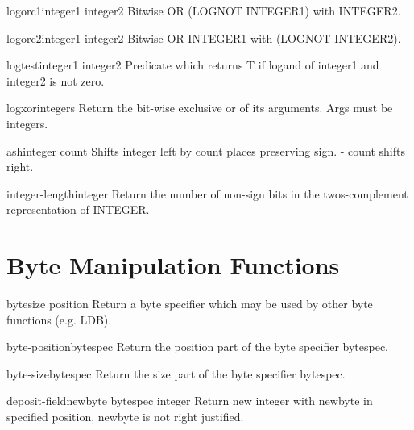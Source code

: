 \documentclass[10pt,english]{book}
\begin{document}
\begin{function}{logorc1}{integer1 integer2}
  Bitwise OR (LOGNOT INTEGER1) with INTEGER2.
\end{function}

\begin{function}{logorc2}{integer1 integer2}
  Bitwise OR INTEGER1 with (LOGNOT INTEGER2).
\end{function}

\begin{function}{logtest}{integer1 integer2}
  Predicate which returns T if logand of integer1 and integer2 is not zero.
\end{function}

\begin{function}{logxor}{\rest integers}
  Return the bit-wise exclusive or of its arguments. Args must be integers.
\end{function}

\begin{function}{ash}{integer count}
  Shifts integer left by count places preserving sign. - count shifts right.
\end{function}

\begin{function}{integer-length}{integer}
  Return the number of non-sign bits in the twos-complement representation
  of INTEGER.
\end{function}

\section{Byte Manipulation Functions}
\label{sec:byte-manip-funct}

\begin{function}{byte}{size position}
  Return a byte specifier which may be used by other byte functions
  (e.g. LDB).
\end{function}

\begin{function}{byte-position}{bytespec}
  Return the position part of the byte specifier bytespec.
\end{function}

\begin{function}{byte-size}{bytespec}
  Return the size part of the byte specifier bytespec.
\end{function}

\begin{function}{deposit-field}{newbyte bytespec integer}
  Return new integer with newbyte in specified position, newbyte is not right justified.
\end{function}
\end{document}
